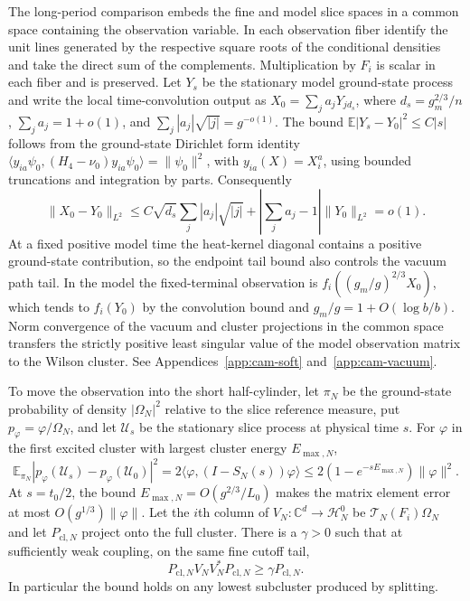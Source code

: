 \documentclass[11pt,a4paper]{article}
\numberwithin{equation}{section}
\begin{document}
The long-period comparison embeds the fine and model slice spaces in a common space containing the observation variable. In each observation fiber identify the unit lines generated by the respective square roots of the conditional densities and take the direct sum of the complements. Multiplication by \(F_i\) is scalar in each fiber and is preserved. Let \(Y_s\) be the stationary model ground-state process and write the local time-convolution output as \(X_0=\sum_j a_jY_{jd_s}\), where \(d_s=g_m^{2/3}/n\), \(\sum_j a_j=1+o(1)\), and \(\sum_j |a_j|\sqrt{|j|}=g^{-o(1)}\). The bound \(\mathbb E|Y_s-Y_0|^2\le C|s|\) follows from the ground-state Dirichlet form identity \(\langle y_{ia}\psi_0,(H_4-\nu_0)y_{ia}\psi_0\rangle=\|\psi_0\|^2\), with \(y_{ia}(X)=X_i^a\), using bounded truncations and integration by parts. Consequently
\[
 \|X_0-Y_0\|_{L^2}
 \le C\sqrt{d_s}\sum_j|a_j|\sqrt{|j|}
       +\left|\sum_j a_j-1\right|\|Y_0\|_{L^2}=o(1).
\]
At a fixed positive model time the heat-kernel diagonal contains a positive ground-state contribution, so the endpoint tail bound also controls the vacuum path tail. In the model the fixed-terminal observation is \(f_i((g_m/g)^{2/3}X_0)\), which tends to \(f_i(Y_0)\) by the convolution bound and \(g_m/g=1+O(\log b/b)\). Norm convergence of the vacuum and cluster projections in the common space transfers the strictly positive least singular value of the model observation matrix to the Wilson cluster. See Appendices~\ref{app:cam-soft} and~\ref{app:cam-vacuum}.

To move the observation into the short half-cylinder, let \(\pi_N\) be the ground-state probability of density \(|\Omega_N|^2\) relative to the slice reference measure, put \(p_\varphi=\varphi/\Omega_N\), and let \(\mathcal U_s\) be the stationary slice process at physical time \(s\). For \(\varphi\) in the first excited cluster with largest cluster energy \(E_{\max,N}\),
\[
 \mathbb E_{\pi_N}|p_\varphi(\mathcal U_s)-p_\varphi(\mathcal U_0)|^2
 =2\langle\varphi,(I-S_N(s))\varphi\rangle
 \le 2(1-e^{-sE_{\max,N}})\|\varphi\|^2 .
\]
At \(s=t_0/2\), the bound \(E_{\max,N}=O(g^{2/3}/L_0)\) makes the matrix element error at most \(O(g^{1/3})\|\varphi\|\). Let the \(i\)th column of \(V_N\colon\mathbb C^d\to\mathcal H_N^0\) be \(\mathcal T_N(F_i)\Omega_N\) and let \(P_{\mathrm{cl},N}\) project onto the full cluster. There is a \(\gamma>0\) such that at sufficiently weak coupling, on the same fine cutoff tail,
\begin{equation}\label{eq:rep-frame}
 P_{\mathrm{cl},N}V_NV_N^*P_{\mathrm{cl},N}
       \geq \gamma P_{\mathrm{cl},N}.
\end{equation}
In particular the bound holds on any lowest subcluster produced by splitting.
\end{document}
